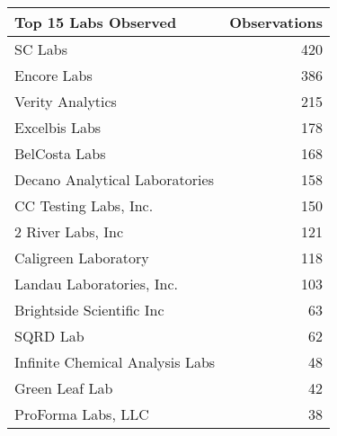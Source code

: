 \begin{tabular}{lr}
\toprule
Top 15 Labs Observed & Observations \\
\midrule
SC Labs & 420 \\
Encore Labs & 386 \\
Verity Analytics & 215 \\
Excelbis Labs & 178 \\
BelCosta Labs & 168 \\
Decano Analytical Laboratories & 158 \\
CC Testing Labs, Inc. & 150 \\
2 River Labs, Inc & 121 \\
Caligreen Laboratory & 118 \\
Landau Laboratories, Inc. & 103 \\
Brightside Scientific Inc & 63 \\
SQRD Lab & 62 \\
Infinite Chemical Analysis Labs & 48 \\
Green Leaf Lab & 42 \\
ProForma Labs, LLC & 38 \\
\bottomrule
\end{tabular}
